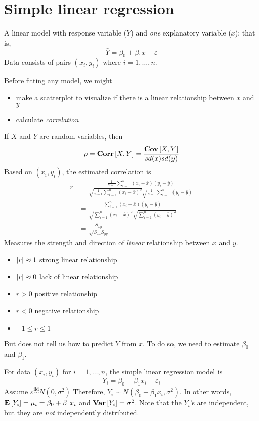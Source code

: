 \section{Simple linear regression}
A linear model with response variable ($ Y $)
and \emph{one} explanatory variable ($ x $); that is,
\[ \bar{Y}=\beta_0+\beta_1x+\varepsilon \]
Data consists of pairs $ (x_i,y_i) $
where $ i=1,\ldots,n $.

Before fitting any model, we might
\begin{itemize}
    \item make a scatterplot to visualize if there
    is a linear relationship between $ x $ and $ y $
    \item calculate \emph{correlation}
\end{itemize}
If $ X $ and $ Y $ are random variables,
then
\[ \rho=\bm{\mathrm{Corr}}\left[X,Y\right]=\frac{\bm{\mathrm{Cov}}\left[X,Y\right]}{sd(x)sd(y)}  \]
Based on $ (x_i,y_i) $, the estimated correlation is
\begin{align*}
    r
    &=\frac{\frac{1}{n-1} \sum\limits_{i=1}^{n}(x_i-\bar{x})(y_i-\bar{y})}
{\sqrt{\frac{1}{n-1}\sum\limits_{i=1}^{n} (x_i-\bar{x})^2}
\sqrt{\frac{1}{n-1}\sum\limits_{i=1}^{n}(y_i-\bar{y})}}\\
&=\frac{\sum\limits_{i=1}^{n} (x_i-\bar{x})(y_i-\bar{y})}{
    \sqrt{\sum\limits_{i=1}^{n} (x_i-\bar{x})^2}
    \sqrt{\sum\limits_{i=1}^{n} (y_i-\bar{y})^2}
}\\
&=\frac{S_{xy}}{\sqrt{S_{xx}S_{yy}}} 
\end{align*}
Measures the strength and direction of \emph{linear} relationship
between $ x $ and $ y $.
\begin{itemize}
    \item $ \lvert r\rvert\approx 1 $ strong linear relationship
    \item $ \lvert r\rvert\approx 0 $ lack of linear relationship
    \item $ r>0 $ positive relationship
    \item $ r<0 $ negative relationship
    \item $ -1\leqslant r\leqslant 1 $
\end{itemize}
But does not tell us how to predict $ Y $ from $ x $. To do so,
we need to estimate $ \beta_0 $ and $ \beta_1 $.

For data $ (x_i,y_i) $ for $ i=1,\ldots,n $, the
simple linear regression model is
\[ Y_i=\beta_0+\beta_1x_i+\varepsilon_i \]
Assume $ \varepsilon\stackrel{\text{iid}}{\sim}N(0,\sigma^2) $
Therefore, $ Y_i\sim N(\beta_0+\beta_1x_i,\sigma^2) $.
In other words, $ \bm{\mathrm{E}}\left[Y_i\right]=\mu_i=\beta_0+\beta_1x_i $
and $ \bm{\mathrm{Var}}\left[Y_i\right]=\sigma^2 $. Note that the $ Y_i $'s
are independent, but they are \emph{not} independently distributed.

